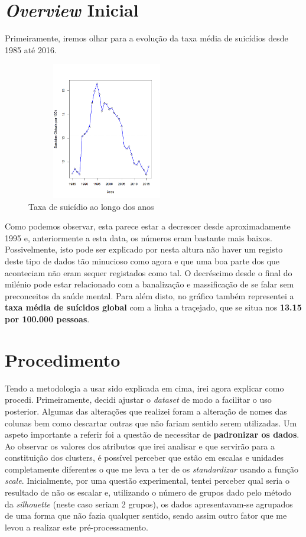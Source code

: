\documentclass[a4paper,12pt]{article}
\begin{document}
\section{\textit{Overview} Inicial}
Primeiramente, iremos olhar para a evolução da taxa média de suicídios desde 1985 até 2016.

\begin{center} %
	\begin{figure}[H]
		\centering
		\includegraphics[width=7cm, height=6cm]{taxaMediaSuicidios100k.png}
		\caption{Taxa de suicídio ao longo dos anos}
	\end{figure}
\end{center}
Como podemos observar, esta parece estar a decrescer desde aproximadamente 1995 e, anteriormente a esta data, os números eram bastante mais baixos. Possivelmente,
isto pode ser explicado por nesta altura não haver um registo deste tipo de dados tão minucioso como agora e que uma boa parte dos que aconteciam não eram sequer registados como tal. O decréscimo desde o final do milénio pode estar relacionado com a banalização e massificação de se falar sem preconceitos da saúde mental. Para além disto, no gráfico também representei a \textbf{taxa média de suícidos global} com a linha a traçejado, que se situa nos \textbf{13.15 por 100.000 pessoas}.


\section{Procedimento}
Tendo a metodologia a usar sido explicada em cima, irei agora explicar como procedi. Primeiramente, decidi ajustar o \textit{dataset} de modo a facilitar o uso posterior. Algumas das alterações que realizei foram a alteração de nomes das colunas bem como descartar outras que não fariam sentido serem utilizadas. Um aspeto importante a referir foi a questão de necessitar de \textbf{padronizar os dados}. Ao observar os valores dos atributos que irei analisar e que servirão para a constituição dos clusters, é possível perceber que estão em escalas e unidades completamente diferentes o que me leva a ter de os \textit{standardizar} usando a função \textit{scale}. Inicialmente, por uma questão experimental, tentei perceber qual seria o resultado de não os escalar e, utilizando o número de grupos dado pelo método da \textit{silhouette} (neste caso seriam 2 grupos), os dados apresentavam-se agrupados de uma forma que não fazia qualquer sentido, sendo assim outro fator que me levou a realizar este pré-processamento.
\end{document}
